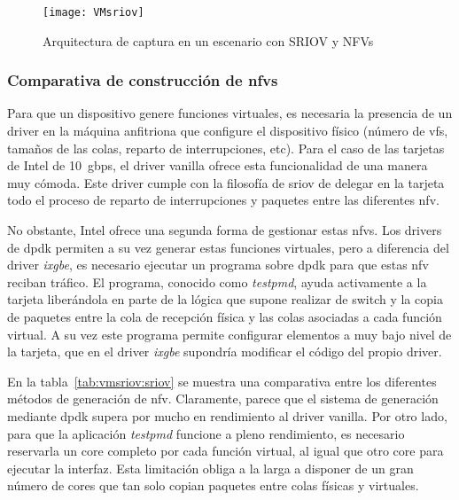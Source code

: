 \begin{figure}[!htb]
\centering
\texttt{[image: VMsriov]}
\caption{Arquitectura de captura en un escenario con SRIOV y NFVs}
\label{fig:vmsriov} 
\end{figure}

\subsubsection{Comparativa de construcción de \glspl{nfv}}

Para que un dispositivo genere funciones virtuales, es necesaria la presencia de un driver en la máquina anfitriona que configure el dispositivo físico (número de \glspl{vf}, tamaños de las colas, reparto de interrupciones, etc). Para el caso de las tarjetas de Intel de 10~\gls{gbps}, el driver \gls{vanilla} ofrece esta funcionalidad de una manera muy cómoda. Este driver cumple con la filosofía de \gls{sriov} de delegar en la tarjeta todo el proceso de reparto de interrupciones y paquetes entre las diferentes \gls{nfv}.

No obstante, Intel ofrece una segunda forma de gestionar estas \glspl{nfv}. Los drivers de \gls{dpdk} permiten a su vez generar estas funciones virtuales, pero a diferencia del driver \textit{ixgbe}, es necesario ejecutar un programa sobre \gls{dpdk} para que estas \gls{nfv} reciban tráfico. El programa, conocido como \textit{testpmd}, ayuda activamente a la tarjeta liberándola en parte de la lógica que supone realizar de switch y la copia de paquetes entre la cola de recepción física y las colas asociadas a cada función virtual.
A su vez este programa permite configurar elementos a muy bajo nivel de la tarjeta, que en el driver \textit{ixgbe} supondría modificar el código del propio driver.

En la tabla~\ref{tab:vmsriov:sriov} se muestra una comparativa entre los diferentes métodos de generación de \gls{nfv}. Claramente, parece que el sistema de generación mediante \gls{dpdk} supera por mucho en rendimiento al driver \gls{vanilla}. Por otro lado, para que la aplicación \textit{testpmd} funcione a pleno rendimiento, es necesario reservarla un \gls{core} completo por cada función virtual, al igual que otro \gls{core} para ejecutar la interfaz. Esta limitación obliga a la larga a disponer de un gran número de cores que tan solo copian paquetes entre colas físicas y virtuales.

